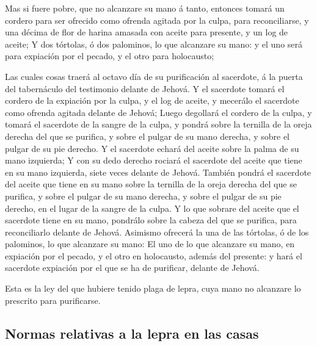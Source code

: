  Mas si fuere pobre, que no alcanzare su mano á tanto,
entonces tomará un cordero para ser ofrecido como ofrenda agitada por la
culpa, para reconciliarse, y una décima de flor de harina amasada con
aceite para presente, y un log de aceite;  Y dos tórtolas,
ó dos palominos, lo que alcanzare su mano: y el uno será para expiación
por el pecado, y el otro para holocausto;

 Las cuales cosas traerá al octavo día de su purificación
al sacerdote, á la puerta del tabernáculo del testimonio delante de
Jehová.  Y el sacerdote tomará el cordero de la expiación
por la culpa, y el log de aceite, y mecerálo el sacerdote como ofrenda
agitada delante de Jehová;  Luego degollará el cordero de
la culpa, y tomará el sacerdote de la sangre de la culpa, y pondrá sobre
la ternilla de la oreja derecha del que se purifica, y sobre el pulgar
de su mano derecha, y sobre el pulgar de su pie derecho.  Y
el sacerdote echará del aceite sobre la palma de su mano izquierda;
 Y con su dedo derecho rociará el sacerdote del aceite que
tiene en su mano izquierda, siete veces delante de Jehová. 
También pondrá el sacerdote del aceite que tiene en su mano sobre la
ternilla de la oreja derecha del que se purifica, y sobre el pulgar de
su mano derecha, y sobre el pulgar de su pie derecho, en el lugar de la
sangre de la culpa.  Y lo que sobrare del aceite que el
sacerdote tiene en su mano, pondrálo sobre la cabeza del que se
purifica, para reconciliarlo delante de Jehová.  Asimismo
ofrecerá la una de las tórtolas, ó de los palominos, lo que alcanzare su
mano:  El uno de lo que alcanzare su mano, en expiación por
el pecado, y el otro en holocausto, además del presente: y hará el
sacerdote expiación por el que se ha de purificar, delante de Jehová.

 Esta es la ley del que hubiere tenido plaga de lepra, cuya
mano no alcanzare lo prescrito para purificarse.

\hypertarget{normas-relativas-a-la-lepra-en-las-casas}{%
\subsection{Normas relativas a la lepra en las
casas}\label{normas-relativas-a-la-lepra-en-las-casas}}

